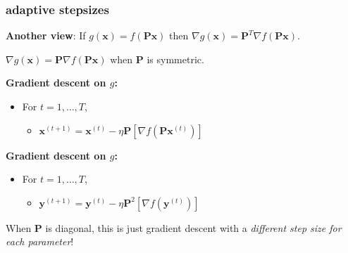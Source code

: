 \documentclass[compress]{beamer}
\newcommand{\bv}[1]{\mathbf{#1}}
\begin{document}


\begin{frame}
	\frametitle{adaptive stepsizes}
	\textbf{Another view}: If $g(\bv{x}) = f(\bv{P}\bv{x})$ then $\nabla g(\bv{x}) = \bv{P}^T\nabla f(\bv{P}\bv{x})$.
	
	$\nabla g(\bv{x})  = \bv{P}\nabla f(\bv{P}\bv{x})$ when $\bv{P}$ is symmetric. 
	
	\vspace{1em}
	\textbf{Gradient descent on $g$:}
	\begin{itemize}
		\item For $t = 1,\ldots, T$,
		\begin{itemize}
			\item $\bv{x}^{(t+1)} = \bv{x}^{(t)} - \eta\bv{P}\left[\nabla f(\bv{P}\bv{x}^{(t)})\right]$
		\end{itemize}
	\end{itemize}
	
	\vspace{1em}
	\textbf{Gradient descent on $g$:}
	\begin{itemize}
		\item For $t = 1,\ldots, T$,
		\begin{itemize}
			\item $\bv{y}^{(t+1)} = \bv{y}^{(t)} - \eta\bv{P}^2\left[\nabla f(\bv{y}^{(t)})\right]$
		\end{itemize}
	\end{itemize}
	\begin{center}
		\alert{When $\bv{P}$ is diagonal, this is just gradient descent with a \emph{different step size for each parameter}!}
	\end{center}
\end{frame}
\end{document}
